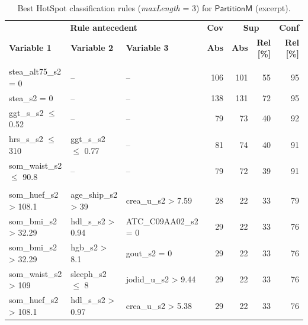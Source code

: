 \documentclass[
  oneside]{book}
\begin{document}
\begin{table}

\caption{\label{tab:03-rule-list-men}Best HotSpot classification rules (\emph{maxLength} = 3) for \(\mathsf{PartitionM}\) (excerpt).}
\centering
\begin{tabular}[t]{lllrrrr}
\toprule
\multicolumn{3}{c}{\textbf{Rule antecedent}} & \multicolumn{1}{c}{\textbf{Cov}} & \multicolumn{2}{c}{\textbf{Sup}} & \multicolumn{1}{c}{\textbf{Conf}} \\
\cmidrule(l{3pt}r{3pt}){1-3} \cmidrule(l{3pt}r{3pt}){4-4} \cmidrule(l{3pt}r{3pt}){5-6} \cmidrule(l{3pt}r{3pt}){7-7}
\textbf{Variable 1} & \textbf{Variable 2} & \textbf{Variable 3} & \textbf{Abs} & \textbf{Abs} & \textbf{Rel [\%]} & \textbf{Rel [\%]}\\
\midrule
\addlinespace[0.3em]
\multicolumn{7}{l}{\textbf{Target class: A}}\\
\hspace{1em}stea\_alt75\_s2 = 0 & -- & -- & 106 & 101 & 55 & 95\\
\hspace{1em}stea\_s2 = 0 & -- & -- & 138 & 131 & 72 & 95\\
\hspace{1em}ggt\_s\_s2 $\leq$ 0.52 & -- & -- & 79 & 73 & 40 & 92\\
\hspace{1em}hrs\_s\_s2 $\leq$ 310 & ggt\_s\_s2 $\leq$ 0.77 & -- & 81 & 74 & 40 & 91\\
\hspace{1em}som\_waist\_s2 $\leq$ 90.8 & -- & -- & 79 & 72 & 39 & 91\\
\addlinespace[0.3em]
\multicolumn{7}{l}{\textbf{Target class: B}}\\
\hspace{1em}som\_huef\_s2 > 108.1 & age\_ship\_s2 > 39 & crea\_u\_s2 > 7.59 & 28 & 22 & 33 & 79\\
\hspace{1em}som\_bmi\_s2 > 32.29 & hdl\_s\_s2 > 0.94 & ATC\_C09AA02\_s2 = 0 & 29 & 22 & 33 & 76\\
\hspace{1em}som\_bmi\_s2 > 32.29 & hgb\_s2 > 8.1 & gout\_s2 = 0 & 29 & 22 & 33 & 76\\
\hspace{1em}som\_waist\_s2 > 109 & sleeph\_s2 $\leq$ 8 & jodid\_u\_s2 > 9.44 & 29 & 22 & 33 & 76\\
\hspace{1em}som\_huef\_s2 > 108.1 & hdl\_s\_s2 > 0.97 & crea\_u\_s2 > 5.38 & 29 & 22 & 33 & 76\\

\end{tabular}
\end{table}
\end{document}
